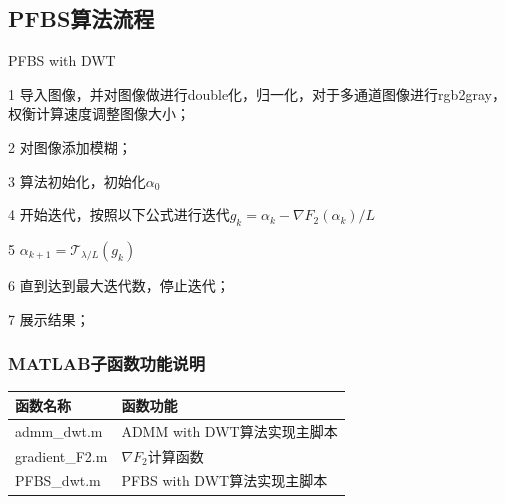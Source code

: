 \documentclass[a4paper, UTF8]{ctexrep}
\begin{document}
		\subsection{PFBS算法流程}
			\begin{algorithm}
				\caption{PFBS with DWT}
				\begin{algorithmic}
					\item[1] 导入图像，并对图像做进行double化，归一化，对于多通道图像进行rgb2gray，权衡计算速度调整图像大小；
					\item[2] 对图像添加模糊；
					\item[3] 算法初始化，初始化$\alpha_0$
					\item[4] 开始迭代，按照以下公式进行迭代$g_k = \alpha_k - \nabla F_2 \left( \alpha_k \right)/L$
					\item[5] $\alpha_{k+1} = \mathcal{T}_{\lambda/L} \left( g_k \right)$
					\item[6] 直到达到最大迭代数，停止迭代；
					\item[7] 展示结果；
				\end{algorithmic}
			\end{algorithm}
		
		\subsubsection{MATLAB子函数功能说明} %
		\label{ssub:matlab子函数功能说明}
			\begin{table}[htbp!]
				\centering
				\begin{tabular}{ll}
					\hline
					函数名称 & 函数功能 \\
					\hline
					admm\_dwt.m & ADMM with DWT算法实现主脚本 \\
					gradient\_F2.m & $\nabla F_2$计算函数 \\
					PFBS\_dwt.m & PFBS with DWT算法实现主脚本 \\
					\hline
				\end{tabular}
			\end{table}
			\clearpage
		
\end{document}
